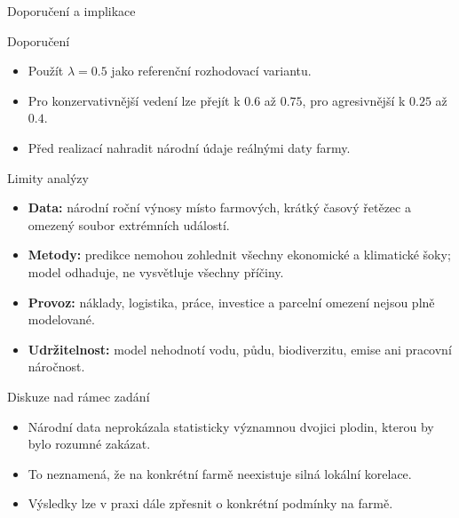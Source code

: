 ﻿\documentclass[11pt]{beamer}
\begin{document}
\begin{frame}{Doporučení a implikace}
  \begin{block}{Doporučení}
    \begin{itemize}
      \item Použít \(\lambda = 0.5\) jako referenční rozhodovací variantu.
      \item Pro konzervativnější vedení lze přejít k \(0.6\) až \(0.75\), pro agresivnější k \(0.25\) až \(0.4\).
      \item Před realizací nahradit národní údaje reálnými daty farmy.
    \end{itemize}
  \end{block}
\end{frame}

\begin{frame}{Limity analýzy}
  \begin{itemize}
    \item \textbf{Data:} národní roční výnosy místo farmových, krátký časový řetězec a omezený soubor extrémních událostí.
    \item \textbf{Metody:} predikce nemohou zohlednit všechny ekonomické a klimatické šoky; model odhaduje, ne vysvětluje všechny příčiny.
    \item \textbf{Provoz:} náklady, logistika, práce, investice a parcelní omezení nejsou plně modelované.
    \item \textbf{Udržitelnost:} model nehodnotí vodu, půdu, biodiverzitu, emise ani pracovní náročnost.
  \end{itemize}
\end{frame}

\begin{frame}{Diskuze nad rámec zadání}
  \begin{itemize}
    \item Národní data neprokázala statisticky významnou dvojici plodin, kterou by bylo rozumné zakázat.
    \item To neznamená, že na konkrétní farmě neexistuje silná lokální korelace.
    \item Výsledky lze v praxi dále zpřesnit o konkrétní podmínky na farmě.
  \end{itemize}
\end{frame}
\end{document}

